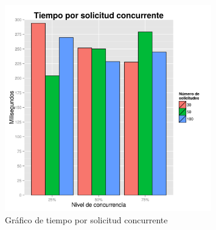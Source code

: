 \begin{figure}[!ht]
	\begin{center}
		\includegraphics[width=0.8\textwidth]{../graphics/gra_tsc.png}
		\caption{Gráfico de tiempo por solicitud concurrente}
		\label{fig:gra_tsc}
	\end{center}
\end{figure}

\newpage
